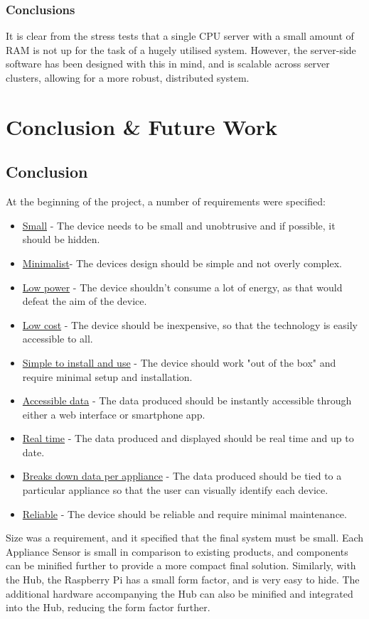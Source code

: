 \documentclass[preprint,12pt,3p]{elsarticle}
\begin{document}
\subsubsection{Conclusions}
It is clear from the stress tests that a single CPU server with a small amount of RAM is not up for the task of a hugely utilised system. However, the server-side software has been designed with this in mind, and is scalable across server clusters, allowing for a more robust, distributed system.
\clearpage

\section{Conclusion \& Future Work}
\subsection{Conclusion}
At the beginning of the project, a number of requirements were specified:
\begin{itemize}
  \item \underline{Small} - The device needs to be small and unobtrusive and if possible, it should be hidden.
  \item \underline{Minimalist}- The devices design should be simple and not overly complex.
  \item \underline{Low power} - The device shouldn't consume a lot of energy, as that would defeat the aim of the device.
  \item \underline{Low cost} - The device should be inexpensive, so that the technology is easily accessible to all.
  \item \underline{Simple to install and use} - The device should work "out of the box" and require minimal setup and installation.
  \item \underline{Accessible data}  - The data produced should be instantly accessible through either a web interface or smartphone app.
  \item \underline{Real time} - The data produced and displayed should be real time and up to date.
  \item \underline{Breaks down data per appliance} - The data produced should be tied to a particular appliance so that the user can visually identify each device.
  \item \underline{Reliable} - The device should be reliable and require minimal maintenance.
\end{itemize}
Size was a requirement, and it specified that the final system must be small. Each Appliance Sensor is small in comparison to existing products, and components can be minified further to provide a more compact final solution. Similarly, with the Hub, the Raspberry Pi has a small form factor, and is very easy to hide. The additional hardware accompanying the Hub can also be minified and integrated into the Hub, reducing the form factor further.\\
\end{document}

